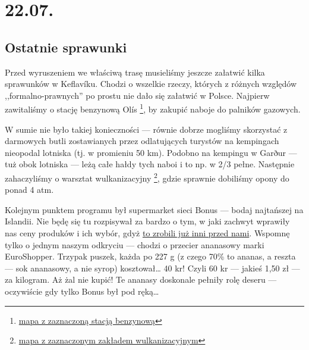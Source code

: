 \chapter*{22.07.}

\section*{Ostatnie sprawunki}

\indent Przed wyruszeniem we właściwą trasę musieliśmy jeszcze załatwić kilka sprawunków w Keflavíku. Chodzi o wszelkie rzeczy, których z różnych względów ,,formalno-prawnych'' po prostu nie dało się załatwić w Polsce.
Najpierw zawitaliśmy o stację benzynową Olís \footnote{\href{https://www.google.com/url?q=https\%3A\%2F\%2Fmaps.google.com\%2Fmaps\%3Fq\%3D63.979816\%2C-22.54672}{mapa z zaznaczoną stacją benzynową}}, by zakupić naboje do palników gazowych.

W sumie nie było takiej konieczności --- równie dobrze mogliśmy skorzystać z darmowych butli zostawianych przez odlatujących turystów na kempingach nieopodal lotniska (tj. w promieniu 50 km). Podobno na kempingu w Garður --- tuż obok lotniska --- leżą całe hałdy tych naboi i to np. w 2/3 pełne.
Następnie zahaczyliśmy o warsztat wulkanizacyjny \footnote{\href{https://www.google.com/url?q=https\%3A\%2F\%2Fmaps.google.com\%2Fmaps\%3Fq\%3D63.982619\%2C-22.546328}{mapa z zaznaczonym zakładem wulkanizacyjnym}}, gdzie sprawnie dobiliśmy opony do ponad 4 atm.



Kolejnym punktem programu był supermarket sieci Bonus --- bodaj najtańszej na Islandii. Nie będę się tu rozpisywał za bardzo o tym, w jaki zachwyt wprawiły nas ceny produków i ich wybór, gdyż \href{http://www.roboppy.net/food/2009/04/iceland-day-1-part-ii-reykjavik-bonus-supermarket-skyr.html}{to zrobili już inni przed nami}. Wspomnę tylko o jednym naszym odkryciu --- chodzi o przecier ananasowy marki EuroShopper. Trzypak puszek, każda po 227 g (z czego 70\% to ananas, a reszta --- sok ananasowy, a nie syrop) kosztował… 40 kr! Czyli 60 kr --- jakieś 1,50 zł --- za kilogram. Aż żal nie kupić! Te ananasy doskonale pełniły rolę deseru --- oczywiście gdy tylko Bonus był pod ręką…


